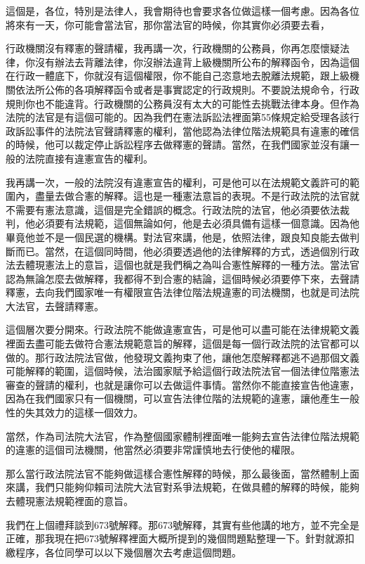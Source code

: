 \documentclass[]{ctexbook}
\begin{document}
這個是，各位，特別是法律人，我會期待也會要求各位做這樣一個考慮。因為各位將來有一天，你可能會當法官，那你當法官的時候，你其實你必須要去看，

行政機關沒有釋憲的聲請權，我再講一次，行政機關的公務員，你再怎麼懷疑法律，你沒有辦法去背離法律，你沒辦法違背上級機關所公布的解釋函令，因為這個在行政一體底下，你就沒有這個權限，你不能自己恣意地去脫離法規範，跟上級機關依法所公佈的各項解釋函令或者是事實認定的行政規則。不要說法規命令，行政規則你也不能違背。行政機關的公務員沒有太大的可能性去挑戰法律本身。但作為法院的法官是有這個可能的。因為我們在憲法訴訟法裡面第55條規定給受理各該行政訴訟事件的法院法官聲請釋憲的權利，當他認為法律位階法規範具有違憲的確信的時候，他可以裁定停止訴訟程序去做釋憲的聲請。當然，在我們國家並沒有讓一般的法院直接有違憲宣告的權利。

我再講一次，一般的法院沒有違憲宣告的權利，可是他可以在法規範文義許可的範圍內，盡量去做合憲的解釋。這也是一種憲法意旨的表現。不是行政法院的法官就不需要有憲法意識，這個是完全錯誤的概念。行政法院的法官，他必須要依法裁判，他必須要有法規範，這個無論如何，他是去必須具備有這樣一個意識。因為他畢竟他並不是一個民選的機構。對法官來講，他是，依照法律，跟良知良能去做判斷而已。當然，在這個同時間，他必須要透過他的法律解釋的方式，透過個別行政法去體現憲法上的意旨，這個也就是我們稱之為叫合憲性解釋的一種方法。當法官認為無論怎麼去做解釋，我都得不到合憲的結論，這個時候必須要停下來，去聲請釋憲，去向我們國家唯一有權限宣告法律位階法規違憲的司法機關，也就是司法院大法官，去聲請釋憲。

這個層次要分開來。行政法院不能做違憲宣告，可是他可以盡可能在法律規範文義裡面去盡可能去做符合憲法規範意旨的解釋，這個是每一個行政法院的法官都可以做的。那行政法院法官做，他發現文義拘束了他，讓他怎麼解釋都逃不過那個文義可能解釋的範圍，這個時候，法治國家賦予給這個行政法院法官一個法律位階憲法審查的聲請的權利，也就是讓你可以去做這件事情。當然你不能直接宣告他違憲，因為在我們國家只有一個機關，可以宣告法律位階的法規範的違憲，讓他產生一般性的失其效力的這樣一個效力。

當然，作為司法院大法官，作為整個國家體制裡面唯一能夠去宣告法律位階法規範的違憲的這個司法機關，他當然必須要非常謹慎地去行使他的權限。

那么當行政法院法官不能夠做這樣合憲性解釋的時候，那么最後面，當然體制上面來講，我們只能夠仰賴司法院大法官對系爭法規範，在做具體的解釋的時候，能夠去體現憲法規範裡面的意旨。

我們在上個禮拜談到673號解釋。那673號解釋，其實有些他講的地方，並不完全是正確，那我現在把673號解釋裡面大概所提到的幾個問題點整理一下。針對就源扣繳程序，各位同學可以以下幾個層次去考慮這個問題。
\end{document}
